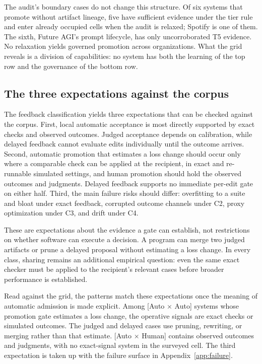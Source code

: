 The audit's boundary cases do not change this structure. Of six systems that promote without artifact lineage, five have sufficient evidence under the tier rule and enter already occupied cells when the audit is relaxed; Spotify is one of them. The sixth, Future AGI's prompt lifecycle, has only uncorroborated T5 evidence. No relaxation yields governed promotion across organizations. What the grid reveals is a division of capabilities: no system has both the learning of the top row and the governance of the bottom row.

\subsection{The three expectations against the corpus}\label{the-three-expectations-against-the-corpus}

The feedback classification yields three expectations that can be checked against the corpus. First, local automatic acceptance is most directly supported by exact checks and observed outcomes. Judged acceptance depends on calibration, while delayed feedback cannot evaluate edits individually until the outcome arrives. Second, automatic promotion that estimates a loss change should occur only where a comparable check can be applied at the recipient, in exact and re-runnable simulated settings, and human promotion should hold the observed outcomes and judgments. Delayed feedback supports no immediate per-edit gate on either half. Third, the main failure risks should differ: overfitting to a suite and bloat under exact feedback, corrupted outcome channels under C2, proxy optimization under C3, and drift under C4.

These are expectations about the evidence a gate can establish, not restrictions on whether software can execute a decision. A program can merge two judged artifacts or prune a delayed proposal without estimating a loss change. In every class, sharing remains an additional empirical question: even the same exact checker must be applied to the recipient's relevant cases before broader performance is established.

Read against the grid, the patterns match these expectations once the meaning of automatic admission is made explicit. Among {[}Auto \(\times\) Auto{]} systems whose promotion gate estimates a loss change, the operative signals are exact checks or simulated outcomes. The judged and delayed cases use pruning, rewriting, or merging rather than that estimate. {[}Auto \(\times\) Human{]} contains observed outcomes and judgments, with no exact-signal system in the surveyed cell. The third expectation is taken up with the failure surface in Appendix~\ref{app:failure}.

